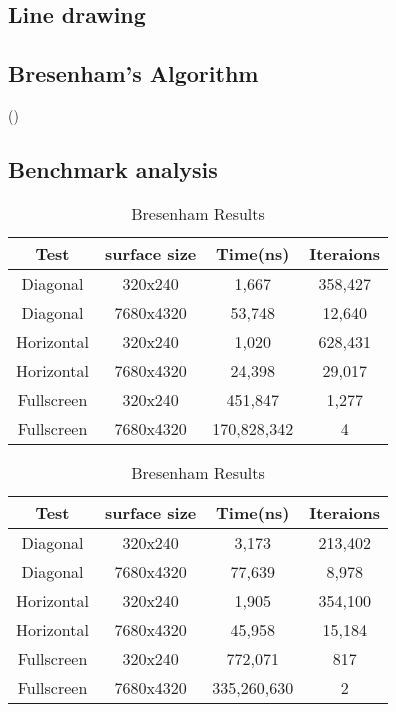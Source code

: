 \documentclass[
	letterpaper, %
	10pt, %
]{CSUniSchoolLabReport}
\begin{document}
\subsection{Line drawing}
\subsection*{Bresenham's Algorithm}
(\cite{Madan:2014})
\subsection*{Benchmark analysis}
\begin{table}[!htb]
    \caption{Line Benchmark Results}
    \begin{minipage}{.5\linewidth}
      \caption{DDA Results}
      \centering
        \begin{tabular}{c c c c}
            Test & surface size & Time(ns) & Iteraions \\ [0.5ex]
			\hline
			Diagonal & 320x240 & 1,667 & 358,427 \\
			Diagonal & 7680x4320 & 53,748 & 12,640 \\
			Horizontal & 320x240 & 1,020 & 628,431  \\
			Horizontal & 7680x4320 & 24,398 & 29,017 \\
			Fullscreen & 320x240 & 451,847 & 1,277 \\
			Fullscreen & 7680x4320 & 170,828,342 & 4 \\
        \end{tabular}
    \end{minipage}%
	\vline
    \begin{minipage}{.5\linewidth}
      \centering
        \caption{Bresenham Results}
        \begin{tabular}{c c c c}
            Test & surface size & Time(ns) & Iteraions \\ [0.5ex]
			\hline
			Diagonal & 320x240 & 3,173 & 213,402 \\
			Diagonal & 7680x4320 & 77,639 & 8,978 \\
			Horizontal & 320x240 & 1,905 & 354,100 \\
			Horizontal & 7680x4320 & 45,958 & 15,184 \\
			Fullscreen & 320x240 & 772,071 & 817 \\
			Fullscreen & 7680x4320 & 335,260,630 & 2 \\
        \end{tabular}
    \end{minipage} 
\end{table}
\end{document}

